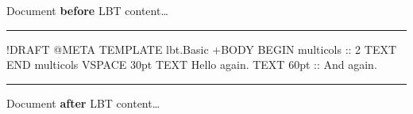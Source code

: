 \documentclass[a4paper,11pt]{article}
\begin{document}

  Document \textbf{before} LBT content\dots

  \noindent\rule{\textwidth}{0.5pt}

  \begin{lbt}
    !DRAFT
    @META
      TEMPLATE lbt.Basic
    +BODY
      BEGIN multicols :: 2
      TEXT \lipsum[1-5]
      END multicols
      VSPACE 30pt
      TEXT Hello again.
      TEXT 60pt :: And again.
  \end{lbt}

  \noindent\rule{\textwidth}{0.5pt}

  Document \textbf{after} LBT content\dots
\end{document}
